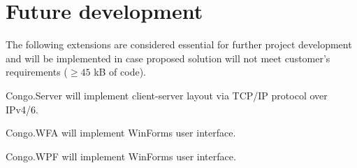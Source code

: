 \section{Future development}

The following extensions are considered essential for further project
development and will be implemented in case proposed solution will not meet
customer's requirements ($\geq 45$ kB of code).

\vspace{0.5em}

\textsf{Congo.Server} will implement client-server layout via TCP/IP protocol
over IPv4/6.

\vspace{0.5em}

\textsf{Congo.WFA} will implement WinForms user interface.

\vspace{0.5em}

\textsf{Congo.WPF} will implement WinForms user interface.
